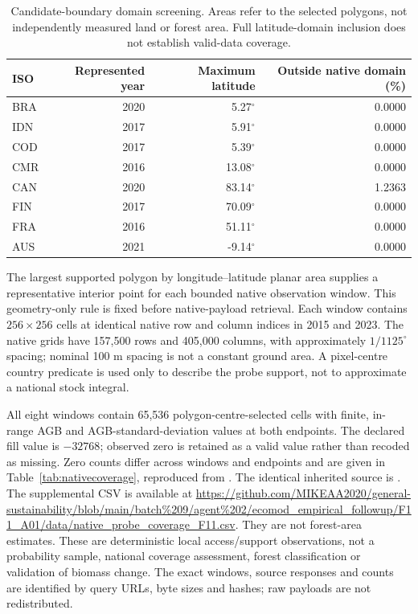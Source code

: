 \documentclass[11pt,a4paper]{article}
\begin{document}
\begin{table}[htbp]
\centering\small
\caption{Candidate-boundary domain screening. Areas refer to the selected polygons, not independently measured land or forest area. Full latitude-domain inclusion does not establish valid-data coverage.}\label{tab:domain}
\begin{tabular}{lrrr}
\toprule
ISO & Represented year & Maximum latitude & Outside native domain (\%)\\\midrule
BRA & 2020 & 5.27$^\circ$ & 0.0000 \\
IDN & 2017 & 5.91$^\circ$ & 0.0000 \\
COD & 2017 & 5.39$^\circ$ & 0.0000 \\
CMR & 2016 & 13.08$^\circ$ & 0.0000 \\
CAN & 2020 & 83.14$^\circ$ & 1.2363 \\
FIN & 2017 & 70.09$^\circ$ & 0.0000 \\
FRA & 2016 & 51.11$^\circ$ & 0.0000 \\
AUS & 2021 & -9.14$^\circ$ & 0.0000 \\
\bottomrule
\end{tabular}
\end{table}

The largest supported polygon by longitude--latitude planar area supplies a representative interior point for each bounded native observation window. This geometry-only rule is fixed before native-payload retrieval. Each window contains $256\times256$ cells at identical native row and column indices in 2015 and 2023. The native grids have 157,500 rows and 405,000 columns, with approximately $1/1125^\circ$ spacing; nominal 100 m spacing is not a constant ground area. A pixel-centre country predicate is used only to describe the probe support, not to approximate a national stock integral.

All eight windows contain 65,536 polygon-centre-selected cells with finite, in-range AGB and AGB-standard-deviation values at both endpoints. The declared fill value is $-32768$; observed zero is retained as a valid value rather than recoded as missing. Zero counts differ across windows and endpoints and are given in Table~\ref{tab:nativecoverage}, reproduced from . The identical inherited source is . The supplemental CSV is available at \url{https://github.com/MIKEAA2020/general-sustainability/blob/main/batch%209/agent%202/ecomod_empirical_followup/F11_A01/data/native_probe_coverage_F11.csv}. They are not forest-area estimates. These are deterministic local access/support observations, not a probability sample, national coverage assessment, forest classification or validation of biomass change. The exact windows, source responses and counts are identified by query URLs, byte sizes and hashes; raw payloads are not redistributed.
\end{document}
